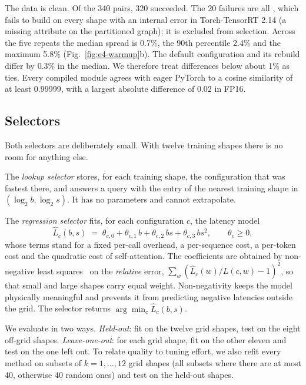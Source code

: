 The data is clean. Of the 340 pairs, 320 succeeded. The 20 failures are all
, which fails to build on every shape with an internal error
in Torch-TensorRT 2.14 (a missing  attribute on the
partitioned graph); it is excluded from selection. Across the five repeats the
median spread is 0.7\%, the 90th percentile 2.4\% and the maximum 5.8\%
(Fig.~\ref{fig:e4-warmup}b). The default configuration and its rebuild differ
by 0.3\% in the median. We therefore treat differences below about 1\% as
ties. Every compiled module agrees with eager PyTorch to a cosine similarity
of at least 0.99999, with a largest absolute difference of 0.02 in FP16.

\subsection{Selectors}
\label{sec:e4-selectors}

Both selectors are deliberately small. With twelve training shapes there is no
room for anything else.

The \emph{lookup selector} stores, for each training shape, the configuration
that was fastest there, and answers a query with the entry of the nearest
training shape in $(\log_2 b, \log_2 s)$. It has no parameters and cannot
extrapolate.

The \emph{regression selector} fits, for each configuration $c$, the latency
model
\begin{equation}
  \hat{L}_c(b,s) \;=\; \theta_{c,0} + \theta_{c,1}\,b + \theta_{c,2}\,bs
                      + \theta_{c,3}\,bs^2 ,
  \qquad \theta_c \ge 0 ,
  \label{eq:model}
\end{equation}
whose terms stand for a fixed per-call overhead, a per-sequence cost, a
per-token cost and the quadratic cost of self-attention. The coefficients are
obtained by non-negative least squares~\cite{lawson1995solving} on the
\emph{relative} error, $\sum_{w}(\hat{L}_c(w)/L(c,w)-1)^2$, so that small and
large shapes carry equal weight. Non-negativity keeps the model physically
meaningful and prevents it from predicting negative latencies outside the
grid. The selector returns $\arg\min_c \hat{L}_c(b,s)$.

We evaluate in two ways. \emph{Held-out}: fit on the twelve grid shapes, test
on the eight off-grid shapes. \emph{Leave-one-out}: for each grid shape, fit
on the other eleven and test on the one left out. To relate quality to tuning
effort, we also refit every method on subsets of $k=1,\dots,12$ grid shapes
(all subsets where there are at most 40, otherwise 40 random ones) and test on
the held-out shapes.

